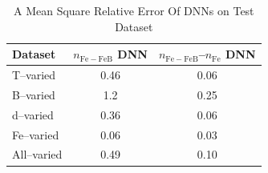 \documentclass[journal]{IEEEtran}
\begin{document}
\begin{table}[!t]
\renewcommand{\arraystretch}{1.3}
\caption{A Mean Square Relative Error Of
DNNs on Test Dataset}
\label{table_MSRE}
\centering
\begin{tabular}{lcc}
\hline
Dataset & $n_\mathrm{Fe-FeB}$ DNN &$n_\mathrm{Fe-FeB}$--$n_\mathrm{Fe}$ DNN\\
\hline
T--varied&0.46 & 0.06\\
B--varied&1.2 & 0.25\\
d--varied&0.36 & 0.06\\
Fe--varied&0.06 & 0.03\\
All--varied&0.49 & 0.10\\
\hline
\end{tabular}
\end{table}
\end{document}
